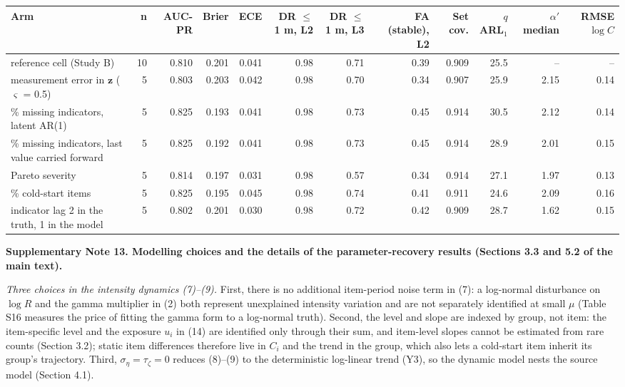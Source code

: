 \noindent\begin{minipage}{\linewidth}
\label{tab:S24}
\centering\scriptsize
\begin{tabular}{>{\raggedright\arraybackslash}p{2.9cm}rrrrrrrrrrr}
\toprule
Arm & n & AUC-PR & Brier & ECE & DR $\le$ 1 m, L2 & DR $\le$ 1 m, L3 & FA (stable), L2 & Set cov. & $q$ ARL$_1$ & $\alpha'$ median & RMSE $\log C$ \\ \midrule
reference cell (Study B) & 10 & 0.810 & 0.201 & 0.041 & 0.98 & 0.71 & 0.39 & 0.909 & 25.5 & – & – \\
measurement error in $\mathbf{z}$ ($\varsigma$ = 0.5) & 5 & 0.803 & 0.203 & 0.042 & 0.98 & 0.70 & 0.34 & 0.907 & 25.9 & 2.15 & 0.14 \\
15\% missing indicators, latent AR(1) & 5 & 0.825 & 0.193 & 0.041 & 0.98 & 0.73 & 0.45 & 0.914 & 30.5 & 2.12 & 0.14 \\
15\% missing indicators, last value carried forward & 5 & 0.825 & 0.192 & 0.041 & 0.98 & 0.73 & 0.45 & 0.914 & 28.9 & 2.01 & 0.15 \\
Pareto severity & 5 & 0.814 & 0.197 & 0.031 & 0.98 & 0.57 & 0.34 & 0.914 & 27.1 & 1.97 & 0.13 \\
20\% cold-start items & 5 & 0.825 & 0.195 & 0.045 & 0.98 & 0.74 & 0.41 & 0.911 & 24.6 & 2.09 & 0.16 \\
indicator lag 2 in the truth, 1 in the model & 5 & 0.802 & 0.201 & 0.030 & 0.98 & 0.72 & 0.42 & 0.909 & 28.7 & 1.62 & 0.15 \\
\bottomrule
\end{tabular}
\end{minipage}
\vspace{14pt}

\textbf{Supplementary Note 13. Modelling choices and the details of the parameter-recovery results (Sections 3.3 and 5.2 of the main text).}

\textit{Three choices in the intensity dynamics (7)–(9).} First, there is no additional item-period noise term in (7): a log-normal disturbance on $\log R$ and the gamma multiplier in (2) both represent unexplained intensity variation and are not separately identified at small $\mu$ (Table S16 measures the price of fitting the gamma form to a log-normal truth). Second, the level and slope are indexed by group, not item: the item-specific level and the exposure $u_i$ in (14) are identified only through their sum, and item-level slopes cannot be estimated from rare counts (Section 3.2); static item differences therefore live in $C_i$ and the trend in the group, which also lets a cold-start item inherit its group's trajectory. Third, $\sigma_\eta = \tau_\zeta = 0$ reduces (8)–(9) to the deterministic log-linear trend (Y3), so the dynamic model nests the source model (Section 4.1).

